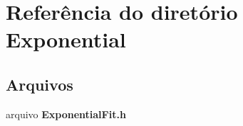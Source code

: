 \section{Referência do diretório Exponential}
\label{dir_16cc29a59ded55bf0db3ef61d9a5df14}
\subsection*{Arquivos}
\begin{DoxyCompactItemize}
\item 
arquivo {\bf Exponential\+Fit.\+h}
\end{DoxyCompactItemize}
